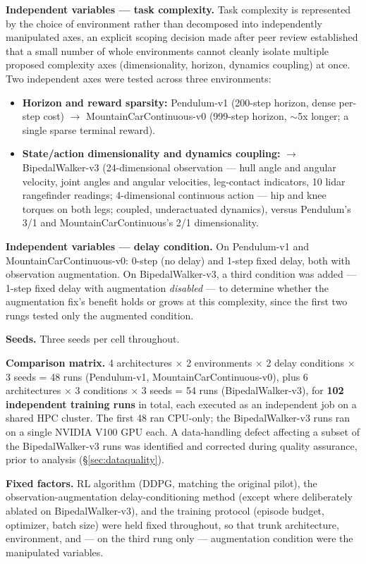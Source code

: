 \documentclass[11pt]{article}
\begin{document}
\textbf{Independent variables --- task complexity.} Task complexity is represented by the choice of environment rather than decomposed into independently manipulated axes, an explicit scoping decision made after peer review established that a small number of whole environments cannot cleanly isolate multiple proposed complexity axes (dimensionality, horizon, dynamics coupling) at once. Two independent axes were tested across three environments:

\begin{itemize}
  \item \textbf{Horizon and reward sparsity:} Pendulum-v1 (200-step horizon, dense per-step cost) $\to$ MountainCarContinuous-v0 (999-step horizon, $\sim$5x longer; a single sparse terminal reward).
  \item \textbf{State/action dimensionality and dynamics coupling:} $\to$ BipedalWalker-v3 (24-dimensional observation --- hull angle and angular velocity, joint angles and angular velocities, leg-contact indicators, 10 lidar rangefinder readings; 4-dimensional continuous action --- hip and knee torques on both legs; coupled, underactuated dynamics), versus Pendulum's 3/1 and MountainCarContinuous's 2/1 dimensionality.
\end{itemize}

\textbf{Independent variables --- delay condition.} On Pendulum-v1 and MountainCarContinuous-v0: 0-step (no delay) and 1-step fixed delay, both with observation augmentation. On BipedalWalker-v3, a third condition was added --- 1-step fixed delay with augmentation \emph{disabled} --- to determine whether the augmentation fix's benefit holds or grows at this complexity, since the first two rungs tested only the augmented condition.

\textbf{Seeds.} Three seeds per cell throughout.

\textbf{Comparison matrix.} 4 architectures $\times$ 2 environments $\times$ 2 delay conditions $\times$ 3 seeds = 48 runs (Pendulum-v1, MountainCarContinuous-v0), plus 6 architectures $\times$ 3 conditions $\times$ 3 seeds = 54 runs (BipedalWalker-v3), for \textbf{102 independent training runs} in total, each executed as an independent job on a shared HPC cluster. The first 48 ran CPU-only; the BipedalWalker-v3 runs ran on a single NVIDIA V100 GPU each. A data-handling defect affecting a subset of the BipedalWalker-v3 runs was identified and corrected during quality assurance, prior to analysis (\S\ref{sec:dataquality}).

\textbf{Fixed factors.} RL algorithm (DDPG, matching the original pilot), the observation-augmentation delay-conditioning method (except where deliberately ablated on BipedalWalker-v3), and the training protocol (episode budget, optimizer, batch size) were held fixed throughout, so that trunk architecture, environment, and --- on the third rung only --- augmentation condition were the manipulated variables.
\end{document}
